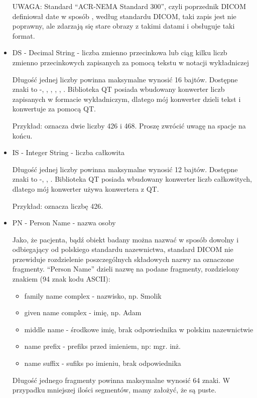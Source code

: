 \begin{itemize}
    UWAGA: Standard \enquote{ACR-NEMA Standard 300}, czyli poprzednik DICOM definiował date w sposób , według standardu DICOM, taki zapis jest nie poprawny, ale zdarzają się stare obrazy z takimi datami i  obsługuje taki format.

    \item DS - Decimal String - liczba zmienno przecinkowa lub ciąg kilku liczb zmienno przecinkowych zapisanych za pomocą tekstu w notacji wykładniczej

    Długość jednej liczby powinna maksymalne wynosić 16 bajtów.
    Dostępne znaki to -, \dataword{+}, \dataword{-}, , , .
    Biblioteka QT posiada wbudowany konwerter liczb zapisanych w formacie wykładniczym, dlatego mój konwerter dzieli tekst i konwertuje za pomocą QT.
    
    Przykład:  oznacza dwie liczby 426 i 468. Proszę zwrócić uwagę na spacje na końcu.

    \item IS - Integer String - liczba całkowita 

    Długość jednej liczby powinna maksymalne wynosić 12 bajtów.
    Dostępne znaki to -, \dataword{+}, \dataword{-}.
    Biblioteka QT posiada wbudowany konwerter liczb całkowitych, dlatego mój konwerter używa konwertera z QT.
    
    Przykład:   oznacza liczbę 426.

    \item PN - Person Name - nazwa osoby

    Jako, że pacjenta, bądź obiekt badany można nazwać w sposób dowolny i odbiegający od polskiego standardu nazewnictwa, standard DICOM nie przewiduje rozdzielenie poszczególnych składowych nazwy na oznaczone fragmenty.
    \enquote{Person Name} dzieli nazwę na podane fragmenty, rozdzielony znakiem \dataword{\^{}} (94 znak kodu ASCII):
    \begin{itemize}
        \item family name complex - nazwisko, np. Smolik
        \item given name complex - imię, np. Adam
        \item middle name - środkowe imię, brak odpowiednika w polskim nazewnictwie
        \item name prefix - prefiks przed imieniem, np: mgr. inż.
        \item name suffix - sufiks po imieniu, brak odpowiednika
    \end{itemize}
    Długość jednego fragmenty powinna maksymalne wynosić 64 znaki.
    W przypadku mniejszej ilości segmentów, mamy założyć, że są puste.
    

\end{itemize}
